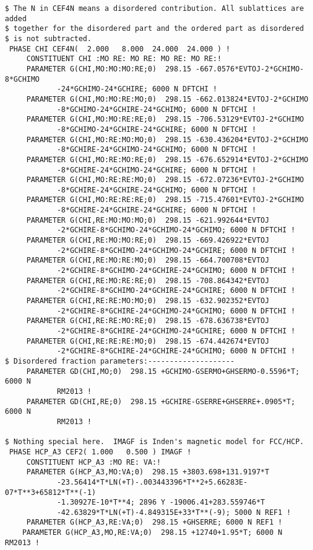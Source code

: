 \documentclass[12pt]{article}
\begin{document}
{\begin{verbatim}
$ The N in CEF4N means a disordered contribution. All sublattices are added
$ together for the disordered part and the ordered part as disordered
$ is not subtracted.
 PHASE CHI CEF4N(  2.000   8.000  24.000  24.000 ) !
     CONSTITUENT CHI :MO RE: MO RE: MO RE: MO RE:!
     PARAMETER G(CHI,MO:MO:MO:RE;0)  298.15 -667.0576*EVTOJ-2*GCHIMO-8*GCHIMO
            -24*GCHIMO-24*GCHIRE; 6000 N DFTCHI !
     PARAMETER G(CHI,MO:MO:RE:MO;0)  298.15 -662.013824*EVTOJ-2*GCHIMO
            -8*GCHIMO-24*GCHIRE-24*GCHIMO; 6000 N DFTCHI !
     PARAMETER G(CHI,MO:MO:RE:RE;0)  298.15 -706.53129*EVTOJ-2*GCHIMO
            -8*GCHIMO-24*GCHIRE-24*GCHIRE; 6000 N DFTCHI !
     PARAMETER G(CHI,MO:RE:MO:MO;0)  298.15 -630.436204*EVTOJ-2*GCHIMO
            -8*GCHIRE-24*GCHIMO-24*GCHIMO; 6000 N DFTCHI !
     PARAMETER G(CHI,MO:RE:MO:RE;0)  298.15 -676.652914*EVTOJ-2*GCHIMO
            -8*GCHIRE-24*GCHIMO-24*GCHIRE; 6000 N DFTCHI !
     PARAMETER G(CHI,MO:RE:RE:MO;0)  298.15 -672.07236*EVTOJ-2*GCHIMO
            -8*GCHIRE-24*GCHIRE-24*GCHIMO; 6000 N DFTCHI !
     PARAMETER G(CHI,MO:RE:RE:RE;0)  298.15 -715.47601*EVTOJ-2*GCHIMO
            -8*GCHIRE-24*GCHIRE-24*GCHIRE; 6000 N DFTCHI !
     PARAMETER G(CHI,RE:MO:MO:MO;0)  298.15 -621.992644*EVTOJ
            -2*GCHIRE-8*GCHIMO-24*GCHIMO-24*GCHIMO; 6000 N DFTCHI !
     PARAMETER G(CHI,RE:MO:MO:RE;0)  298.15 -669.426922*EVTOJ
            -2*GCHIRE-8*GCHIMO-24*GCHIMO-24*GCHIRE; 6000 N DFTCHI !
     PARAMETER G(CHI,RE:MO:RE:MO;0)  298.15 -664.700708*EVTOJ
            -2*GCHIRE-8*GCHIMO-24*GCHIRE-24*GCHIMO; 6000 N DFTCHI !
     PARAMETER G(CHI,RE:MO:RE:RE;0)  298.15 -708.864342*EVTOJ
            -2*GCHIRE-8*GCHIMO-24*GCHIRE-24*GCHIRE; 6000 N DFTCHI !
     PARAMETER G(CHI,RE:RE:MO:MO;0)  298.15 -632.902352*EVTOJ
            -2*GCHIRE-8*GCHIRE-24*GCHIMO-24*GCHIMO; 6000 N DFTCHI !
     PARAMETER G(CHI,RE:RE:MO:RE;0)  298.15 -678.636738*EVTOJ
            -2*GCHIRE-8*GCHIRE-24*GCHIMO-24*GCHIRE; 6000 N DFTCHI !
     PARAMETER G(CHI,RE:RE:RE:MO;0)  298.15 -674.442674*EVTOJ
            -2*GCHIRE-8*GCHIRE-24*GCHIRE-24*GCHIMO; 6000 N DFTCHI !
$ Disordered fraction parameters:--------------------
     PARAMETER GD(CHI,MO;0)  298.15 +GCHIMO-GSERMO+GHSERMO-0.5596*T; 6000 N 
            RM2013 !
     PARAMETER GD(CHI,RE;0)  298.15 +GCHIRE-GSERRE+GHSERRE+.0905*T; 6000 N 
            RM2013 !

$ Nothing special here.  IMAGF is Inden's magnetic model for FCC/HCP.
 PHASE HCP_A3 CEF2( 1.000   0.500 ) IMAGF !
     CONSTITUENT HCP_A3 :MO RE: VA:!
     PARAMETER G(HCP_A3,MO:VA;0)  298.15 +3803.698+131.9197*T
            -23.56414*T*LN(+T)-.003443396*T**2+5.66283E-07*T**3+65812*T**(-1)
            -1.30927E-10*T**4; 2896 Y -19006.41+283.559746*T
            -42.63829*T*LN(+T)-4.849315E+33*T**(-9); 5000 N REF1 !
     PARAMETER G(HCP_A3,RE:VA;0)  298.15 +GHSERRE; 6000 N REF1 !
    PARAMETER G(HCP_A3,MO,RE:VA;0)  298.15 +12740+1.95*T; 6000 N RM2013 !


\end{verbatim}}
\end{document}
